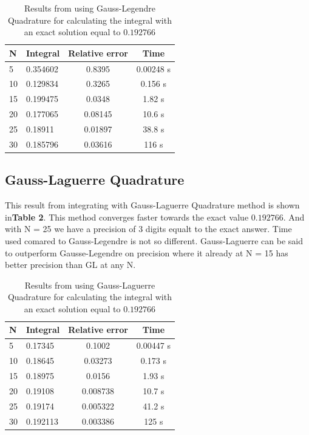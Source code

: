 \documentclass[twoside,twocolumn]{article}
\begin{document}
\begin{table}[h]
\centering
\begin{tabular}{|l|l|c|c|}
\hline
N  & Integral & \multicolumn{1}{l|}{Relative error} & Time      \\ \hline
5  & 0.354602 & 0.8395                              & 0.00248 s \\ \hline
10 & 0.129834 & 0.3265                              & 0.156 s   \\ \hline
15 & 0.199475 & 0.0348                              & 1.82 s    \\ \hline
20 & 0.177065 & 0.08145                             & 10.6 s    \\ \hline
25 & 0.18911  & 0.01897                             & 38.8 s    \\ \hline
30 & 0.185796 & 0.03616                             & 116 s     \\ \hline
\end{tabular}
\caption{Results from using Gauss-Legendre Quadrature for calculating the integral with an exact solution equal to $0.192766$}
\end{table}


\subsection{Gauss-Laguerre Quadrature}
This result from integrating with Gauss-Laguerre Quadrature method is shown in\textbf{Table 2}. This method converges faster towards the exact value  $0.192766$. And with N = 25 we have a precision of 3 digits equalt to the exact answer. Time used comared to Gauss-Legendre is not so different. Gauss-Laguerre can be said to outperform Gausse-Legendre on precision where it already at N = 15 has better precision than GL at any N.

\begin{table}[h]
\centering
\begin{tabular}{|l|l|c|c|}
\hline
N  & Integral & \multicolumn{1}{l|}{Relative error} & Time      \\ \hline
5  & 0.17345  & 0.1002                              & 0.00447 s \\ \hline
10 & 0.18645  & 0.03273                             & 0.173 s   \\ \hline
15 & 0.18975  & 0.0156                              & 1.93 s    \\ \hline
20 & 0.19108  & 0.008738                            & 10.7 s    \\ \hline
25 & 0.19174  & 0.005322                            & 41.2 s    \\ \hline
30 & 0.192113 & 0.003386                            & 125 s     \\ \hline
\end{tabular}
\caption{Results from using Gauss-Laguerre Quadrature for calculating the integral with an exact solution equal to $0.192766$}
\end{table}
\end{document}
